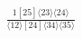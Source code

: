 \documentclass[varwidth, border=5pt]{standalone}
\begin{document}
\begin{my}
$\begin{gathered}
\scriptscriptstyle\frac{1[25]⟨23⟩⟨24⟩}{⟨12⟩[24]⟨34⟩⟨35⟩}
\end{gathered}$
\end{my}
\end{document}
